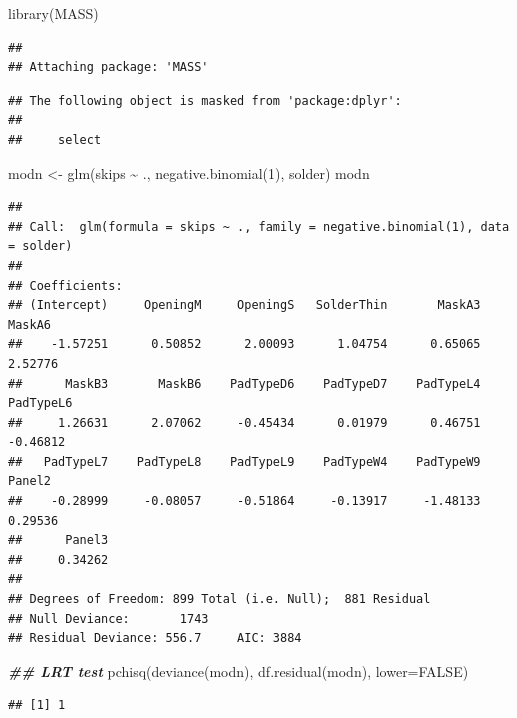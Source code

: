 \documentclass[
  ignorenonframetext,
]{beamer}
\newenvironment{Shaded}{\begin{snugshade}}{\end{snugshade}}
\newcommand{\AttributeTok}[1]{\textcolor[rgb]{0.77,0.63,0.00}{#1}}
\newcommand{\ConstantTok}[1]{\textcolor[rgb]{0.00,0.00,0.00}{#1}}
\newcommand{\DecValTok}[1]{\textcolor[rgb]{0.00,0.00,0.81}{#1}}
\newcommand{\DocumentationTok}[1]{\textcolor[rgb]{0.56,0.35,0.01}{\textbf{\textit{#1}}}}
\newcommand{\FunctionTok}[1]{\textcolor[rgb]{0.00,0.00,0.00}{#1}}
\newcommand{\NormalTok}[1]{#1}
\newcommand{\OtherTok}[1]{\textcolor[rgb]{0.56,0.35,0.01}{#1}}
\newcommand{\SpecialCharTok}[1]{\textcolor[rgb]{0.00,0.00,0.00}{#1}}
\begin{document}
\begin{frame}[fragile]{}
\protect\hypertarget{section-33}{}
\tiny

\begin{Shaded}
\begin{Highlighting}[]
\FunctionTok{library}\NormalTok{(MASS)}
\end{Highlighting}
\end{Shaded}

\begin{verbatim}
## 
## Attaching package: 'MASS'
\end{verbatim}

\begin{verbatim}
## The following object is masked from 'package:dplyr':
## 
##     select
\end{verbatim}

\begin{Shaded}
\begin{Highlighting}[]
\NormalTok{modn }\OtherTok{\textless{}{-}} \FunctionTok{glm}\NormalTok{(skips }\SpecialCharTok{\textasciitilde{}}\NormalTok{ ., }\FunctionTok{negative.binomial}\NormalTok{(}\DecValTok{1}\NormalTok{), solder)}
\NormalTok{modn}
\end{Highlighting}
\end{Shaded}

\begin{verbatim}
## 
## Call:  glm(formula = skips ~ ., family = negative.binomial(1), data = solder)
## 
## Coefficients:
## (Intercept)     OpeningM     OpeningS   SolderThin       MaskA3       MaskA6  
##    -1.57251      0.50852      2.00093      1.04754      0.65065      2.52776  
##      MaskB3       MaskB6    PadTypeD6    PadTypeD7    PadTypeL4    PadTypeL6  
##     1.26631      2.07062     -0.45434      0.01979      0.46751     -0.46812  
##   PadTypeL7    PadTypeL8    PadTypeL9    PadTypeW4    PadTypeW9       Panel2  
##    -0.28999     -0.08057     -0.51864     -0.13917     -1.48133      0.29536  
##      Panel3  
##     0.34262  
## 
## Degrees of Freedom: 899 Total (i.e. Null);  881 Residual
## Null Deviance:       1743 
## Residual Deviance: 556.7     AIC: 3884
\end{verbatim}

\begin{Shaded}
\begin{Highlighting}[]
\DocumentationTok{\#\# LRT test}
\FunctionTok{pchisq}\NormalTok{(}\FunctionTok{deviance}\NormalTok{(modn), }\FunctionTok{df.residual}\NormalTok{(modn), }\AttributeTok{lower=}\ConstantTok{FALSE}\NormalTok{)}
\end{Highlighting}
\end{Shaded}

\begin{verbatim}
## [1] 1
\end{verbatim}
\end{frame}
\end{document}

